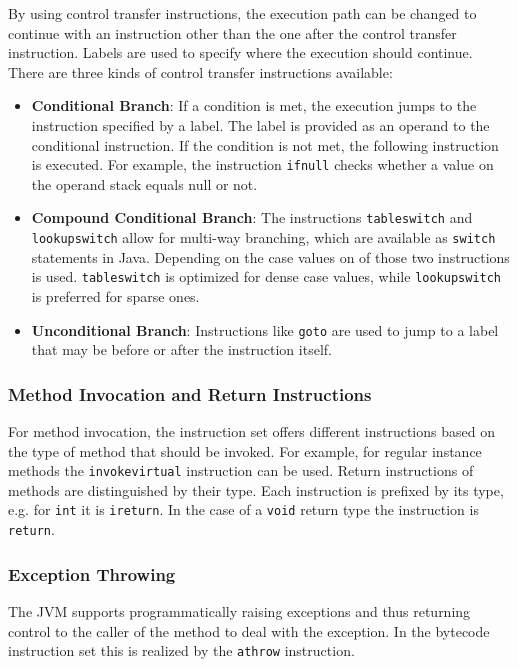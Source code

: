 By using control transfer instructions, the execution path can be changed to continue with an instruction other than the one after the control transfer instruction. Labels are used to specify where the execution should continue. There are three kinds of control transfer instructions available:

\begin{itemize}
    \item \textbf{Conditional Branch}: If a condition is met, the execution jumps to the instruction specified by a label. The label is provided as an operand to the conditional instruction. If the condition is not met, the following instruction is executed. For example, the instruction \texttt{ifnull} checks whether a value on the operand stack equals null or not.
    \item \textbf{Compound Conditional Branch}: The instructions \texttt{tableswitch} and \break \texttt{lookupswitch} allow for multi-way branching, which are available as \texttt{switch} statements in Java. Depending on the case values on of those two instructions is used. \texttt{tableswitch} is optimized for dense case values, while \texttt{lookupswitch} is preferred for sparse ones.
    \item \textbf{Unconditional Branch}: Instructions like \texttt{goto} are used to jump to a label that may be before or after the instruction itself. 
\end{itemize}

\subsubsection{Method Invocation and Return Instructions}

For method invocation, the instruction set offers different instructions based on the type of method that should be invoked. For example, for regular instance methods the \texttt{invokevirtual} instruction can be used. Return instructions of methods are distinguished by their type. Each instruction is prefixed by its type, e.g. for \texttt{int} it is \texttt{ireturn}. In the case of a \texttt{void} return type the instruction is \texttt{return}. 

\subsubsection{Exception Throwing}

The JVM supports programmatically raising exceptions and thus returning control to the caller of the method to deal with the exception. In the bytecode instruction set this is realized by the \texttt{athrow} instruction.  

